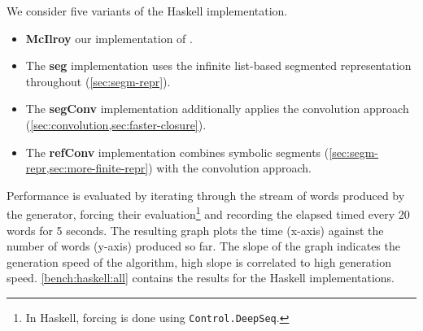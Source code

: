 We consider five variants of the Haskell implementation.
\begin{itemize}
\item \textbf{McIlroy} our implementation of \citet{DBLP:journals/jfp/McIlroy04}. 
\item The \textbf{seg} implementation uses the infinite list-based segmented
  representation throughout (\cref{sec:segm-repr}).
\item The \textbf{segConv} implementation additionally
  applies the convolution approach (\cref{sec:convolution,sec:faster-closure}).
\item The \textbf{refConv} implementation combines
   symbolic segments (\cref{sec:segm-repr,sec:more-finite-repr}) with the convolution approach.
\end{itemize}

Performance is evaluated by iterating through the stream of words
produced by the generator, forcing their evaluation\footnote{In
  Haskell, forcing is done using \lstinline{Control.DeepSeq}.}
and recording the elapsed timed every 20 words for 5 seconds.
The resulting graph plots the time (x-axis) against the number of words (y-axis) produced so far. The slope of the graph indicates the generation speed of the algorithm, high slope is correlated to high generation speed.  \cref{bench:haskell:all} contains the results for the Haskell implementations.
 
